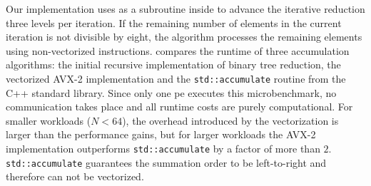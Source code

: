 Our implementation uses  as a subroutine inside  to advance the iterative reduction three levels per iteration.
If the remaining number of elements in the current iteration is not divisible by eight, the algorithm processes the remaining elements using non-vectorized instructions.
 compares the runtime of three accumulation algorithms: the initial recursive implementation of binary tree reduction, the vectorized AVX-2 implementation and the \texttt{std::accumulate} routine from the C++ standard library.
Since only one \gls{pe} executes this microbenchmark, no communication takes place and all runtime costs are purely computational.
For smaller workloads ($N < 64$), the overhead introduced by the vectorization is larger than the performance gains, but for larger workloads the AVX-2 implementation outperforms \texttt{std::accumulate} by a factor of more than $2$.
\texttt{std::accumulate} guarantees the summation order to be left-to-right and therefore can not be vectorized.
